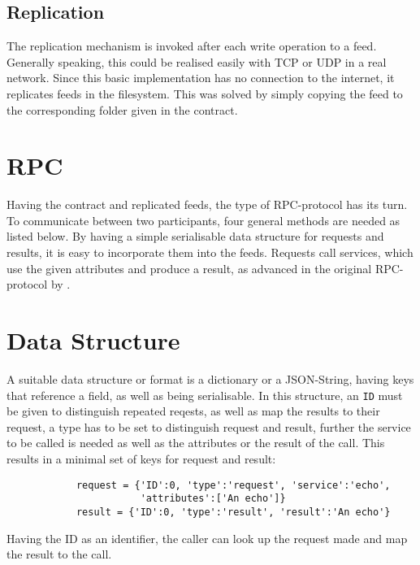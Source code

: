 \subsection{Replication}
The replication mechanism is invoked after each write operation to a feed. Generally speaking, this could be realised easily with TCP or UDP in a real network. Since this basic implementation has no connection to the internet, it replicates feeds in the filesystem. This was solved by simply copying the feed to the corresponding folder given in the contract.
\section{RPC}
Having the contract and replicated feeds, the type of RPC-protocol has its turn. To communicate between two participants, four general methods are needed as listed below. By having a simple serialisable data structure for requests and results, it is easy to incorporate them into the feeds. Requests call services, which use the given attributes and produce a result, as advanced in the original RPC-protocol by \citet{birrell1984implementing}.
\section{Data Structure}
A suitable data structure or format is a dictionary or a JSON-String, having keys that reference a field, as well as being serialisable. In this structure, an \lstinline{ID} must be given to distinguish repeated reqests, as well as map the results to their request, a type has to be set to distinguish request and result, further the service to be called is needed as well as the attributes or the result of the call. This results in a minimal set of keys for request and result:\\


    \begin{python}
        \begin{lstlisting}
            request = {'ID':0, 'type':'request', 'service':'echo', 
                       'attributes':['An echo']}
            result = {'ID':0, 'type':'result', 'result':'An echo'}
            \end{lstlisting}
    \end{python}




Having the ID as an identifier, the caller can look up the request made and map the result to the call.
